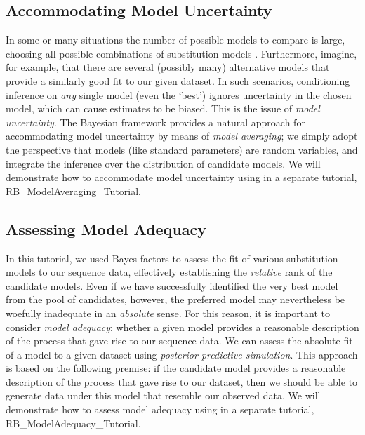 \subsection{Accommodating Model Uncertainty}
In some or many situations the number of possible models to compare is large, \EG choosing all possible combinations of substitution models \citep{Huelsenbeck2004}.
Furthermore, imagine, for example, that there are several (possibly many) alternative models that provide a similarly good fit to our given dataset.
In such scenarios, conditioning inference on \textit{any} single model (even the `best') ignores uncertainty in the chosen model, which can cause estimates to be biased.
This is the issue of \emph{model uncertainty}.
The Bayesian framework provides a natural approach for accommodating model uncertainty by means of \textit{model averaging}; we simply adopt the perspective that models (like standard parameters) are random variables, and integrate the inference over the distribution of candidate models.
We will demonstrate how to accommodate model uncertainty using \RevBayes in a separate tutorial, RB\_ModelAveraging\_Tutorial.

\subsection{Assessing Model Adequacy}
In this tutorial, we used Bayes factors to assess the fit of various substitution models to our sequence data, effectively establishing the \emph{relative} rank of the candidate models.
Even if we have successfully identified the very best model from the pool of candidates, however, the preferred model may nevertheless be woefully inadequate in an \emph{absolute} sense. 
For this reason, it is important to consider \emph{model adequacy}: whether a given model provides a reasonable description of the process that gave rise to our sequence data. 
We can assess the absolute fit of a model to a given dataset using \emph{posterior predictive simulation}.
This approach is based on the following premise: if the candidate model provides a reasonable description of the process that gave rise to our dataset, then we should be able to generate data under this model that resemble our observed data.
We will demonstrate how to assess model adequacy using \RevBayes in a separate tutorial, RB\_ModelAdequacy\_Tutorial.







